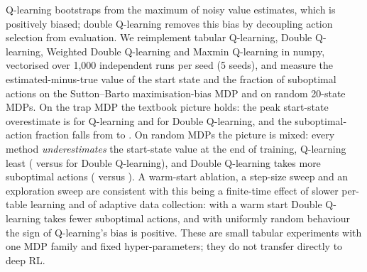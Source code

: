 Q-learning bootstraps from the maximum of noisy value estimates, which is positively biased; double Q-learning removes this bias by decoupling action selection from evaluation. We reimplement tabular Q-learning, Double Q-learning, Weighted Double Q-learning and Maxmin Q-learning in numpy, vectorised over 1,000 independent runs per seed (5 seeds), and measure the estimated-minus-true value of the start state and the fraction of suboptimal actions on the Sutton--Barto maximisation-bias MDP and on random 20-state MDPs. On the trap MDP the textbook picture holds: the peak start-state overestimate is  for Q-learning and  for Double Q-learning, and the suboptimal-action fraction falls from  to . On random MDPs the picture is mixed: every method \emph{underestimates} the start-state value at the end of training, Q-learning least ( versus  for Double Q-learning), and Double Q-learning takes more suboptimal actions ( versus ). A warm-start ablation, a step-size sweep and an exploration sweep are consistent with this being a finite-time effect of slower per-table learning and of adaptive data collection: with a warm start Double Q-learning takes fewer suboptimal actions, and with uniformly random behaviour the sign of Q-learning's bias is positive. These are small tabular experiments with one MDP family and fixed hyper-parameters; they do not transfer directly to deep RL.
